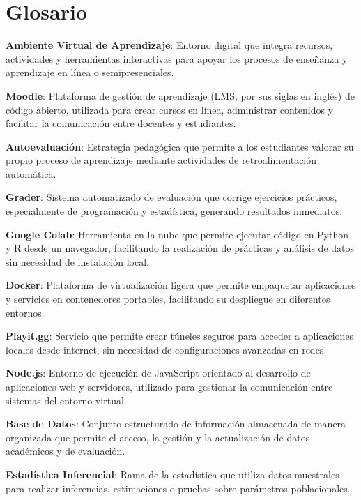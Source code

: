 \documentclass[letter,oneside,12pt,spanish]{report}
\begin{document}
\parskip=12pt
\tableofcontents                    

\newpage

\listoffigures                         %
\newpage
\listoftables
\newpage

\chapter*{Glosario}

\begin{description}

\item \textbf{Ambiente Virtual de Aprendizaje}: Entorno digital que integra recursos, actividades y herramientas interactivas para apoyar los procesos de enseñanza y aprendizaje en línea o semipresenciales.
\item \textbf{Moodle}: Plataforma de gestión de aprendizaje (LMS, por sus siglas en inglés) de código abierto, utilizada para crear cursos en línea, administrar contenidos y facilitar la comunicación entre docentes y estudiantes.
\item \textbf{Autoevaluación}: Estrategia pedagógica que permite a los estudiantes valorar su propio proceso de aprendizaje mediante actividades de retroalimentación automática.
\item \textbf{Grader}: Sistema automatizado de evaluación que corrige ejercicios prácticos, especialmente de programación y estadística, generando resultados inmediatos.
\item \textbf{Google Colab}: Herramienta en la nube que permite ejecutar código en Python y R desde un navegador, facilitando la realización de prácticas y análisis de datos sin necesidad de instalación local.
\item \textbf{Docker}: Plataforma de virtualización ligera que permite empaquetar aplicaciones y servicios en contenedores portables, facilitando su despliegue en diferentes entornos.
\item \textbf{Playit.gg}: Servicio que permite crear túneles seguros para acceder a aplicaciones locales desde internet, sin necesidad de configuraciones avanzadas en redes.
\item \textbf{Node.js}: Entorno de ejecución de JavaScript orientado al desarrollo de aplicaciones web y servidores, utilizado para gestionar la comunicación entre sistemas del entorno virtual.
\item \textbf{Base de Datos}: Conjunto estructurado de información almacenada de manera organizada que permite el acceso, la gestión y la actualización de datos académicos y de evaluación.
\item \textbf{Estadística Inferencial}: Rama de la estadística que utiliza datos muestrales para realizar inferencias, estimaciones o pruebas sobre parámetros poblacionales.

\end{description}
\end{document}

